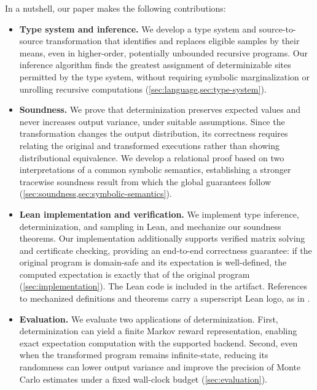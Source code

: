 In a nutshell, our paper makes the following contributions:
\begin{itemize}[leftmargin=*]
  \item[] \textbf{Type system and inference.}
  We develop a type system and source-to-source
  transformation that identifies and replaces eligible samples by their means, even in higher-order,
  potentially unbounded recursive programs.
  Our inference algorithm finds the greatest assignment of
  determinizable sites permitted by the type system,
  without requiring symbolic marginalization or unrolling
  recursive computations (\cref{sec:language,sec:type-system}).

  \item[] \textbf{Soundness.} We prove that determinization preserves expected values
  and never increases output variance, under suitable
  assumptions. Since the transformation changes the output
  distribution, its correctness requires relating the
  original and transformed executions rather than showing
  distributional equivalence. We develop a relational proof
  based on two interpretations of a common symbolic
  semantics, establishing a stronger tracewise soundness
  result from which the global guarantees follow
  (\cref{sec:soundness,sec:symbolic-semantics}).

    \item[] \textbf{Lean implementation and verification.}
    We implement type inference, determinization, and sampling
  in Lean, and mechanize our soundness theorems.
  Our implementation additionally supports verified
  matrix solving and certificate checking, providing an
  end-to-end correctness guarantee: if the original program
  is domain-safe and its expectation is well-defined, the
  computed expectation is exactly that of the original
  program
  (\cref{sec:implementation}).
  The Lean code is included in the artifact. References to mechanized
  definitions and theorems carry a superscript Lean logo, as in
  \leanmark.

    \item[] \textbf{Evaluation.} We evaluate two applications of determinization.
First, determinization can yield a finite Markov reward representation,
enabling exact expectation computation with the supported backend.
Second, even when the transformed program remains infinite-state,
reducing its randomness can lower output variance and improve
the precision of Monte Carlo estimates under a fixed
wall-clock budget (\cref{sec:evaluation}).
\end{itemize}
